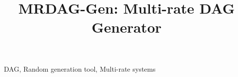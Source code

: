 \documentclass[conference]{IEEEtran}
\newcommand{\todo}[1]{}
\begin{document}
\title{MRDAG-Gen: Multi-rate DAG Generator}
\maketitle

\author{
}



\begin{IEEEkeywords}
    DAG, Random generation tool, Multi-rate systems
\end{IEEEkeywords}















\end{document}

